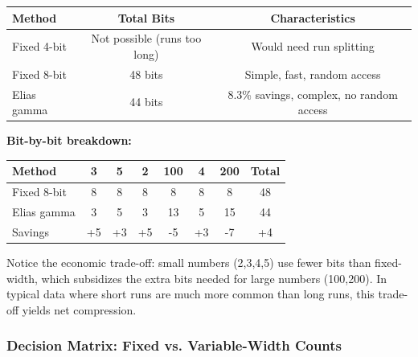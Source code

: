 \begin{examplebox}
\begin{tabular}{|l|c|c|}
\hline
\textbf{Method} & \textbf{Total Bits} & \textbf{Characteristics} \\
\hline
Fixed 4-bit & Not possible (runs too long) & Would need run splitting \\
Fixed 8-bit & 48 bits & Simple, fast, random access \\
Elias gamma & 44 bits & 8.3\% savings, complex, no random access \\
\hline
\end{tabular}

\textbf{Bit-by-bit breakdown:}

\begin{tabular}{|l|c|c|c|c|c|c|c|}
\hline
\textbf{Method} & \textbf{3} & \textbf{5} & \textbf{2} & \textbf{100} & \textbf{4} & \textbf{200} & \textbf{Total} \\
\hline
Fixed 8-bit & 8 & 8 & 8 & 8 & 8 & 8 & 48 \\
Elias gamma & 3 & 5 & 3 & 13 & 5 & 15 & 44 \\
Savings & +5 & +3 & +5 & -5 & +3 & -7 & +4 \\
\hline
\end{tabular}

Notice the economic trade-off: small numbers (2,3,4,5) use fewer bits than fixed-width, which subsidizes the extra bits needed for large numbers (100,200). In typical data where short runs are much more common than long runs, this trade-off yields net compression.
\end{examplebox}

\subsubsection*{Decision Matrix: Fixed vs. Variable-Width Counts}

